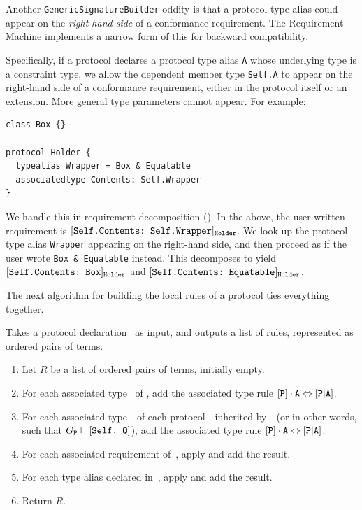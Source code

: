 \documentclass[../generics]{subfiles}
\begin{document}
\begin{example}
Another \texttt{GenericSignatureBuilder} oddity is that a protocol type alias could appear on the \emph{right-hand side} of a conformance requirement. The Requirement Machine implements a narrow form of this for backward compatibility.

Specifically, if a protocol declares a protocol type alias \texttt{A} whose underlying type is a constraint type, we allow the dependent member type \texttt{Self.A} to appear on the right-hand side of a conformance requirement, either in the protocol itself or an extension. More general type parameters cannot appear. For example:
\begin{Verbatim}
class Box {}

protocol Holder {
  typealias Wrapper = Box & Equatable
  associatedtype Contents: Self.Wrapper
}
\end{Verbatim}
We handle this in requirement decomposition (). In the above, the user-written requirement is $[\texttt{Self.Contents:~Self.Wrapper}]_{\texttt{Holder}}$. We look up the protocol type alias \texttt{Wrapper} appearing on the right-hand side, and then proceed as if the user wrote \verb|Box & Equatable| instead. This decomposes to yield $[\texttt{Self.Contents:~Box}]_{\texttt{Holder}}$ and $[\texttt{Self.Contents:~Equatable}]_{\texttt{Holder}}$.
\end{example}

The next algorithm for building the local rules of a protocol ties everything together.

\begin{algorithm}\label{rules for protocol algo}
Takes a protocol declaration \tP\ as input, and outputs a list of rules, represented as ordered pairs of terms.
\begin{enumerate}
\item Let $R$ be a list of ordered pairs of terms, initially empty.
\item For each associated type \nA\ of \tP, add the associated type rule $[\texttt{P}] \cdot \texttt{A} \Leftrightarrow [\texttt{P}|\texttt{A}]$.
\item For each associated type~\nA\ of each protocol~\tQ\ inherited by~\tP\ (or in other words, such that $G_{\texttt{P}}\vdash[\texttt{Self:~Q}]$), add the associated type rule $[\texttt{P}] \cdot \texttt{A} \Leftrightarrow [\texttt{P}|\texttt{A}]$.
\item For each associated requirement of~\tP, apply  and add the result.
\item For each type alias declared in~\tP, apply  and add the result.
\item Return $R$.
\end{enumerate}
\end{algorithm}
\end{document}
